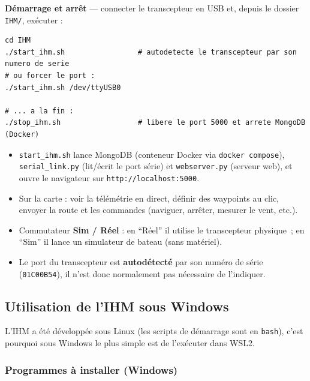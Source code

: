 \documentclass[12pt,a4paper]{article}
\newcommand{\file}[1]{\texttt{#1}}
\begin{document}
\textbf{D\'emarrage et arr\^et} --- connecter le transcepteur en USB et, depuis le
dossier \file{IHM/}, ex\'ecuter :

\begin{lstlisting}[style=shell, caption={Demarrer et arreter l'IHM sous Linux}]
cd IHM
./start_ihm.sh                 # autodetecte le transcepteur par son numero de serie
# ou forcer le port :
./start_ihm.sh /dev/ttyUSB0

# ... a la fin :
./stop_ihm.sh                  # libere le port 5000 et arrete MongoDB (Docker)
\end{lstlisting}

\begin{itemize}
  \item \file{start\_ihm.sh} lance MongoDB (conteneur Docker via
    \texttt{docker compose}), \file{serial\_link.py} (lit/\'ecrit le port s\'erie) et
    \file{webserver.py} (serveur web), et ouvre le navigateur sur
    \texttt{http://localhost:5000}.
  \item Sur la carte : voir la t\'el\'em\'etrie en direct, d\'efinir des waypoints au
    clic, envoyer la route et les commandes (naviguer, arr\^eter, mesurer le vent, etc.).
  \item Commutateur \textbf{Sim / R\'eel} : en ``R\'eel'' il utilise le transcepteur
    physique~; en ``Sim'' il lance un simulateur de bateau (sans mat\'eriel).
  \item Le port du transcepteur est \textbf{autod\'etect\'e} par son num\'ero de
    s\'erie (\texttt{01C00B54}), il n'est donc normalement pas n\'ecessaire de
    l'indiquer.
\end{itemize}

\subsection{Utilisation de l'IHM sous Windows}

L'IHM a \'et\'e d\'evelopp\'ee sous Linux (les scripts de d\'emarrage sont en
\texttt{bash}), c'est pourquoi sous Windows le plus simple est de l'ex\'ecuter dans
WSL2.

\subsubsection{Programmes à installer (Windows)}
\end{document}
